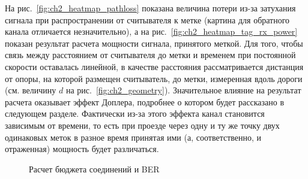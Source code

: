 На рис.~\ref{fig:ch2_heatmap_pathloss} показана величина потери из-за затухания сигнала при распространении от считывателя к метке (картина для обратного канала отличается незначительно), а на рис.~\ref{fig:ch2_heatmap_tag_rx_power} показан результат расчета мощности сигнала, принятого меткой. Для того, чтобы связь между расстоянием от считывателя до метки и временем при постоянной скорости оставалась линейной, в качестве расстояния рассматривается дистанция от опоры, на которой размещен считыватель, до метки, измеренная вдоль дороги (см. величину $d$ на рис.~\ref{fig:ch2_geometry}). Значительное влияние на результат расчета оказывает эффект Доплера, подробнее о котором будет рассказано в следующем разделе. Фактически из-за этого эффекта канал становится зависимым от времени, то есть при проезде через одну и ту же точку двух одинаковых меток в разное время принятая ими (а, соответственно, и отраженная) мощность будет различаться.



\begin{figure}[ht]
  \caption{Расчет бюджета соединений и BER}
  \label{fig:ch2_heatmap}
\end{figure}




